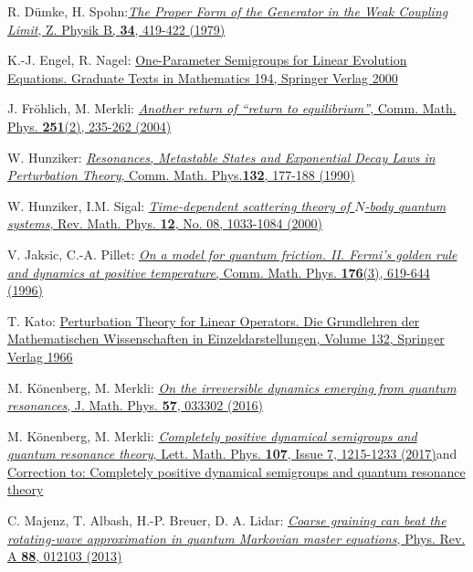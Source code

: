 \documentclass[letterpaper,onecolumn,11pt,accepted=2021-12-09]{quantumarticle}
\numberwithin{equation}{section}
\begin{document}
\begin{thebibliography}{}
R. D\"umke, H. Spohn:\href{https://doi.org/10.1007/BF01325208}{{\em The Proper Form of the Generator in the Weak Coupling Limit}, Z. Physik B, {\bf 34}, 419-422 (1979)}


K.-J. Engel, R. Nagel: \href{https://doi.org/10.1007/b97696}{One-Parameter Semigroups for Linear Evolution Equations. Graduate Texts in
Mathematics 194, Springer Verlag 2000}

J. Fr\"ohlich, M. Merkli: \href{http://dx.doi.org/10.1007/s00220-004-1176-6}{{\em Another return of ``return to equilibrium''},  Comm. Math. Phys.  {\bf 251}(2), 235-262
(2004)}

W. Hunziker: \href{http://dx.doi.org/10.1007/BF02278006}{{\em Resonances, Metastable States
and Exponential Decay Laws in Perturbation Theory}, Comm. Math. Phys.{\bf 132}, 177-188 (1990)  }

W. Hunziker, I.M. Sigal: \href{http://dx.doi.org/10.1142/S0129055X0000040X}{{\em Time-dependent scattering theory of $N$-body quantum systems}, Rev. Math. Phys. {\bf 12}, No. 08, 1033-1084 (2000)}

V. Jaksic, C.-A. Pillet: \href{http://dx.doi.org/10.1007/BF02099252}{{\em On a model for quantum friction. II. Fermi’s golden rule and dynamics at positive temperature},  Comm. Math. Phys. {\bf 176}(3), 619-644 (1996)}

T. Kato: \href{http://dx.doi.org/10.1007/978-3-662-12678-3}{Perturbation Theory for Linear Operators. Die Grundlehren der Mathematischen Wissenschaften
in Einzeldarstellungen, Volume 132, Springer Verlag 1966}

M. K\"onenberg, M. Merkli: \href{http://dx.doi.org/10.1063/1.4944614}{{\em   On the irreversible dynamics emerging from quantum resonances}, J. Math. Phys. {\bf 57}, 033302 (2016)}

M. K\"onenberg, M. Merkli: \href{http://dx.doi.org/10.1007/s11005-017-0937-z}{{\em Completely positive dynamical semigroups and quantum resonance theory},  Lett. Math. Phys. {\bf 107}, Issue 7, 1215-1233 (2017)}\quad and \quad \href{http://dx.doi.org/10.1007/s11005-019-01177-9}{Correction to: Completely positive dynamical semigroups and quantum resonance theory}


C. Majenz, T. Albash, H.-P. Breuer, D. A. Lidar: \href{http://dx.doi.org/10.1103/PhysRevA.88.012103}{{\em Coarse graining can beat the rotating-wave approximation in quantum Markovian master equations}, Phys. Rev. A {\bf 88}, 012103 (2013)}



\end{thebibliography}
\end{document}
